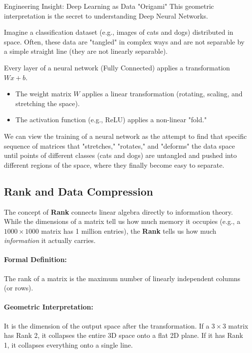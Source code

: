 \begin{unibobox}{Engineering Insight: Deep Learning as Data "Origami"}
This geometric interpretation is the secret to understanding Deep Neural Networks.

Imagine a classification dataset (e.g., images of cats and dogs) distributed in space. Often, these data are "tangled" in complex ways and are not separable by a simple straight line (they are not linearly separable).

Every layer of a neural network (Fully Connected) applies a transformation $Wx + b$.
\begin{itemize}
    \item The weight matrix $W$ applies a linear transformation (rotating, scaling, and stretching the space).
    \item The activation function (e.g., ReLU) applies a non-linear "fold."
\end{itemize}

We can view the training of a neural network as the attempt to find that specific sequence of matrices that "stretches," "rotates," and "deforms" the data space until points of different classes (cats and dogs) are untangled and pushed into different regions of the space, where they finally become easy to separate.
\end{unibobox}

\subsection{Rank and Data Compression}

The concept of \textbf{Rank} connects linear algebra directly to information theory.
While the dimensions of a matrix tell us how much memory it occupies (e.g., a $1000 \times 1000$ matrix has 1 million entries), the \textbf{Rank} tells us how much \textit{information} it actually carries.

\paragraph{Formal Definition:} The rank of a matrix is the maximum number of linearly independent columns (or rows).
\paragraph{Geometric Interpretation:} It is the dimension of the output space after the transformation. If a $3 \times 3$ matrix has Rank 2, it collapses the entire 3D space onto a flat 2D plane. If it has Rank 1, it collapses everything onto a single line.

